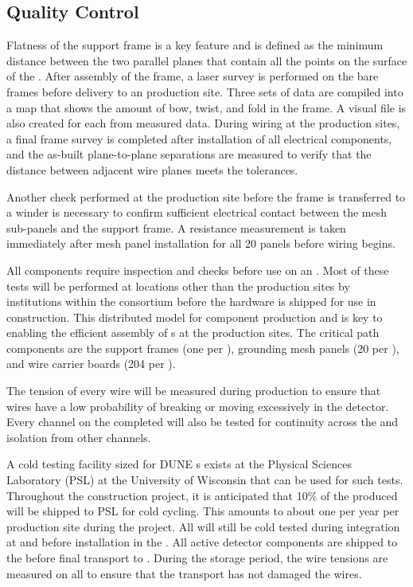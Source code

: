 \subsection{ Quality Control}

Flatness of the  support frame is a key feature and is
defined as the minimum distance between the two parallel planes that 
contain all the points on the surface of the . After
assembly of the  frame, a laser survey is performed on
the bare frames before  delivery to an 
production site. Three sets of data are compiled into a map that shows
the amount of bow, twist, and fold in the frame. A visual file is also
created for each  from measured data. During 
wiring at the production sites, a final frame survey is completed
after installation of all electrical components, and the as-built
plane-to-plane separations are measured to verify that the
distance between adjacent wire planes meets the tolerances.

Another check performed at the  production site before the
frame is transferred to a winder is necessary to confirm sufficient
electrical contact between the mesh sub-panels and the 
support frame. A resistance measurement is taken immediately after
mesh panel installation for all 20 panels before wiring begins.

All components require inspection and  checks before use on an
. Most of these tests will be performed at locations other than the
 production sites by institutions within the consortium before the
hardware is shipped for use in  construction. This distributed
model for component production and  is key to enabling the efficient
assembly of s at the production sites. The critical path components
are the support frames (one per ), grounding mesh panels (20 per
), and wire carrier boards (204 per ).

The tension of every wire will be measured during production to ensure
that wires have a low probability of breaking or moving excessively in the
detector. Every channel on the completed  will also be tested for
continuity across the  and isolation from other channels.

A cold testing facility sized for DUNE s exists at the 
Physical Sciences Laboratory (PSL) at the University of Wisconsin
 that can be
used for such tests. Throughout the construction project, it is
anticipated that 10\% of the produced  will be shipped to PSL for
cold cycling. This amounts to about one  per year per production site
during the project. %
All  will still be cold
tested during integration at  and before installation in the . %
All active detector components are shipped to the  
before final transport to . During the storage period, the wire
tensions are measured on all  to ensure that the transport has
not damaged the wires.

